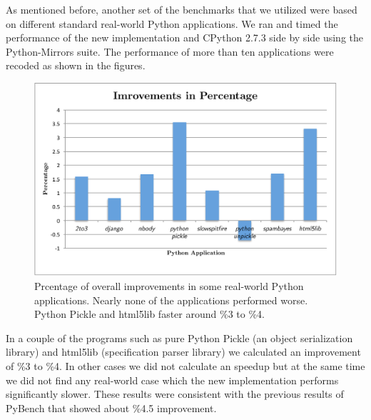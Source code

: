 \documentclass[12pt]{article}
\begin{document}
As mentioned before, another set of the benchmarks that we utilized were based on different standard real-world Python applications. We ran and timed the performance of the new implementation and CPython 2.7.3 side by side using the Python-Mirrors suite. The performance of more than ten applications were recoded as shown in the figures.

\begin{figure}[H]
  \centering
  \includegraphics[width=12cm]{appsbench.pdf}
  \caption{Prcentage of overall improvements in some real-world Python applications. Nearly none of the applications performed worse. Python Pickle and html5lib faster around \%3 to \%4. }
\end{figure}




In a couple of the programs such as pure Python Pickle (an object serialization library) and html5lib (specification parser library) we calculated an improvement of \%3 to \%4. In other cases we did not calculate an speedup but at the same time we did not find any real-world case which the new implementation performs significantly slower. These results were consistent with the previous results of PyBench that showed about \%4.5 improvement.
 
\end{document}

